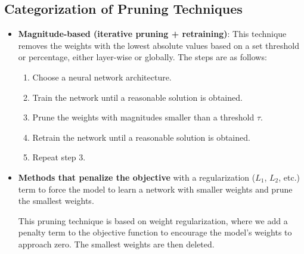 \subsection{Categorization of Pruning Techniques}
\begin{itemize}
    \item \textbf{Magnitude-based (iterative pruning + retraining)}: This technique
          removes the weights with the lowest absolute values based on a set
          threshold or percentage, either layer-wise or globally. The steps are
          as follows:
          \begin{enumerate}
              \item Choose a neural network architecture.
              \item Train the network until a reasonable solution is obtained.
              \item Prune the weights with magnitudes smaller than a threshold $\tau$.
              \item Retrain the network until a reasonable solution is obtained.
              \item Repeat step 3.
          \end{enumerate}
    \item \textbf{Methods that penalize the objective} with a regularization
          ($L_1$, $L_2$, etc.) term to force the model to learn a network with
          smaller weights and prune the smallest weights.

          This pruning technique is based on weight regularization, where we add
          a penalty term to the objective function to encourage the model's weights
          to approach zero. The smallest weights are then deleted.


\end{itemize}
